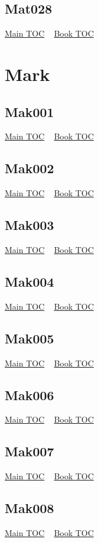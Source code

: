 \documentclass{book}
\begin{document}
  \section{Mat028}\hyperlink{toc}{Main TOC} ~ \hyperref[subsec:Mat]{Book TOC} 
  \chapter{Mark} \label{subsec:Mak} \begin{multicols}{2} \minitoc \end{multicols}
  \section{Mak001}\hyperlink{toc}{Main TOC} ~ \hyperref[subsec:Mak]{Book TOC} 
  \section{Mak002}\hyperlink{toc}{Main TOC} ~ \hyperref[subsec:Mak]{Book TOC} 
  \section{Mak003}\hyperlink{toc}{Main TOC} ~ \hyperref[subsec:Mak]{Book TOC} 
  \section{Mak004}\hyperlink{toc}{Main TOC} ~ \hyperref[subsec:Mak]{Book TOC} 
  \section{Mak005}\hyperlink{toc}{Main TOC} ~ \hyperref[subsec:Mak]{Book TOC} 
  \section{Mak006}\hyperlink{toc}{Main TOC} ~ \hyperref[subsec:Mak]{Book TOC} 
  \section{Mak007}\hyperlink{toc}{Main TOC} ~ \hyperref[subsec:Mak]{Book TOC} 
  \section{Mak008}\hyperlink{toc}{Main TOC} ~ \hyperref[subsec:Mak]{Book TOC} 
\end{document}
